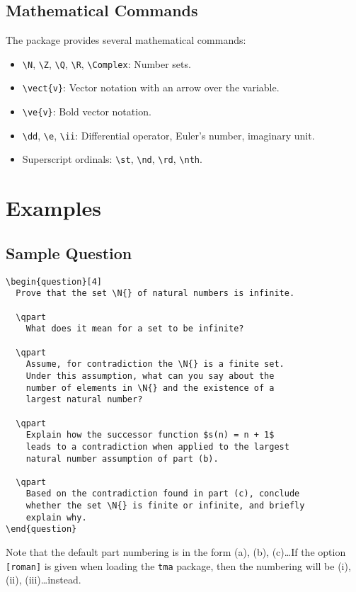 \documentclass{article}
\begin{document}
\subsection{Mathematical Commands}

The package provides several mathematical commands:

\begin{itemize}
\item  \verb|\N|, \verb|\Z|, \verb|\Q|, \verb|\R|, \verb|\Complex|: Number sets.
\item  \verb|\vect{v}|: Vector notation with an arrow over the variable.
\item  \verb|\ve{v}|: Bold vector notation.
\item  \verb|\dd|, \verb|\e|, \verb|\ii|: Differential operator, Euler's number, imaginary unit.
\item  Superscript ordinals: \verb|\st|, \verb|\nd|, \verb|\rd|, \verb|\nth|.
\end{itemize}

\section{Examples}

\subsection{Sample Question}

\begin{verbatim}
\begin{question}[4]
  Prove that the set \N{} of natural numbers is infinite.
  
  \qpart
    What does it mean for a set to be infinite?
    
  \qpart
    Assume, for contradiction the \N{} is a finite set. 
    Under this assumption, what can you say about the 
    number of elements in \N{} and the existence of a 
    largest natural number?
    
  \qpart
    Explain how the successor function $s(n) = n + 1$ 
    leads to a contradiction when applied to the largest 
    natural number assumption of part (b).
    
  \qpart
    Based on the contradiction found in part (c), conclude 
    whether the set \N{} is finite or infinite, and briefly 
    explain why.
\end{question}
\end{verbatim}

Note that the default part numbering is in the form (a), (b), (c)\dots If the option \verb|[roman]| is given when loading the \verb|tma| package, then the numbering will be (i), (ii), (iii)\dots instead.
\end{document}
